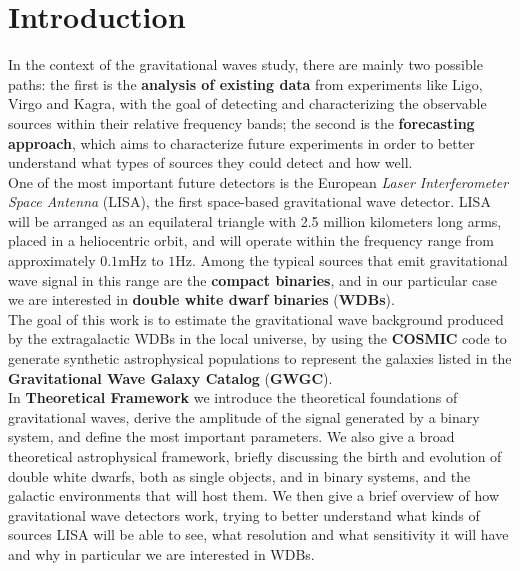 \chapter*{Introduction}
In the context of the gravitational waves study, there are mainly two possible paths: the first is the \textbf{analysis of existing data} from experiments like Ligo, Virgo and Kagra, with the goal of detecting and characterizing the observable sources within their relative frequency bands;
the second is the \textbf{forecasting approach}, which aims to characterize future experiments in order to better understand what types of sources they could detect and how well.
\vspace{2mm}\\
One of the most important future detectors is the European \textit{Laser Interferometer Space Antenna} (LISA), the first space-based gravitational wave detector. 
LISA will be arranged as an equilateral triangle with 2.5 million kilometers long arms, placed in a heliocentric orbit, and will operate within the frequency range from approximately $0.1\mathrm{mHz}$ to $1\mathrm{Hz}$. 
Among the typical sources that emit gravitational wave signal in this range are the \textbf{compact binaries}, and in our particular case we are interested in \textbf{double white dwarf binaries} (\textbf{WDBs}).
\vspace{2mm}\\
The goal of this work is to estimate the gravitational wave background produced by the extragalactic WDBs in the local universe, by using the \textbf{COSMIC} code to generate synthetic astrophysical populations to represent the galaxies listed in the \textbf{Gravitational Wave Galaxy Catalog} (\textbf{GWGC}).\vspace{2mm}
\\  
In \textbf{Theoretical Framework} we introduce the theoretical foundations of gravitational waves, derive the amplitude of the signal generated by a binary system, and define the most important parameters.
We also give a broad theoretical astrophysical framework, briefly discussing the birth and evolution of double white dwarfs, both as single objects, and in binary systems, and the galactic environments that will host them.
We then give a brief overview of how gravitational wave detectors work, trying to better understand what kinds of sources LISA will be able to see, what resolution and what sensitivity it will have and why in particular we are interested in WDBs.
\vspace{2mm}\\
